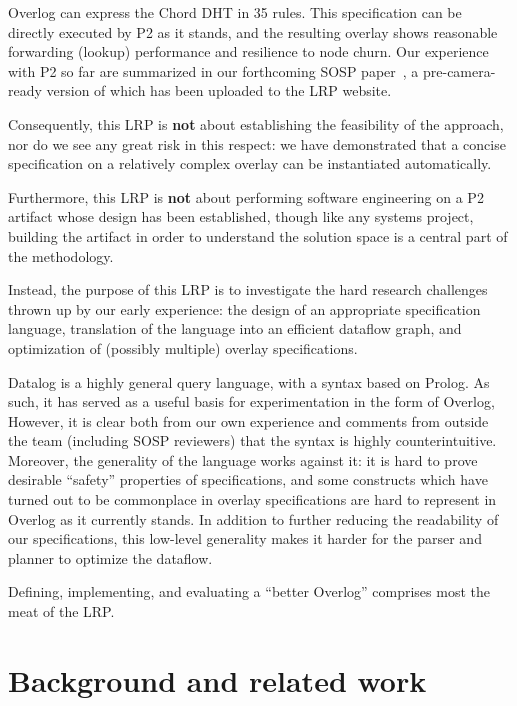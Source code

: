 \documentclass[twocolumn,10pt]{article}
\begin{document}
Overlog can express the Chord DHT in 35 rules.  This specification can
be directly executed by P2 as it stands, and the resulting overlay
shows reasonable forwarding (lookup) performance and resilience to
node churn.  Our experience with P2 so far are summarized in our
forthcoming SOSP paper~\cite{p2_sosp05}, a pre-camera-ready version of
which has been uploaded to the LRP website.  

Consequently, this LRP is \textbf{not} about establishing the
feasibility of the approach, nor do we see any great risk in this
respect: we have demonstrated that a concise specification on a
relatively complex overlay can be instantiated automatically. 

Furthermore, this LRP is \textbf{not} about performing software
engineering on a P2 artifact whose design has been established, though
like any systems project, building the artifact in order to understand
the solution space is a central part of the methodology.  

Instead, the purpose of this LRP is to investigate the hard research
challenges thrown up by our early experience: the design of an
appropriate specification language, translation of the language into
an efficient dataflow graph, and optimization of (possibly multiple)
overlay specifications. 

Datalog is a highly general query language, with a syntax based on
Prolog.  As such, it has served as a useful basis for experimentation
in the form of Overlog,  However, it is clear both from our own
experience and comments from outside the team (including SOSP
reviewers) that the syntax is highly counterintuitive.  Moreover, the
generality of the language works against it: it is hard to prove
desirable ``safety'' properties of specifications, and some constructs
which have turned out to be commonplace in overlay specifications are
hard to represent in Overlog as it currently stands.  In addition to
further reducing the readability of our specifications, this
low-level generality makes it harder for the parser and planner to
optimize the dataflow.   

Defining, implementing, and evaluating a ``better Overlog'' comprises
most the meat of the LRP. 

\section{Background and related work}
\label{sec:background}
\end{document}
